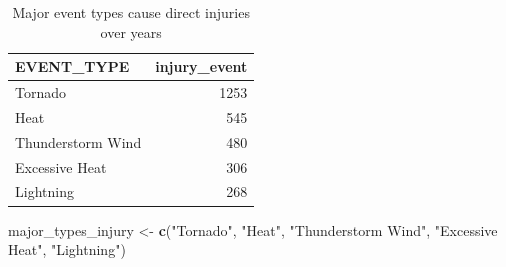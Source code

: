 \documentclass[
]{article}
\newenvironment{Shaded}{\begin{snugshade}}{\end{snugshade}}
\newcommand{\DataTypeTok}[1]{\textcolor[rgb]{0.13,0.29,0.53}{#1}}
\newcommand{\DecValTok}[1]{\textcolor[rgb]{0.00,0.00,0.81}{#1}}
\newcommand{\KeywordTok}[1]{\textcolor[rgb]{0.13,0.29,0.53}{\textbf{#1}}}
\newcommand{\NormalTok}[1]{#1}
\newcommand{\OperatorTok}[1]{\textcolor[rgb]{0.81,0.36,0.00}{\textbf{#1}}}
\newcommand{\StringTok}[1]{\textcolor[rgb]{0.31,0.60,0.02}{#1}}
\begin{document}
\begin{Shaded}
\end{Shaded}

\begin{table}[!h]

\caption{\label{tab:tab1}Major event types cause direct injuries over years}
\centering
\begin{tabular}[t]{lr}
\toprule
EVENT\_TYPE & injury\_event\\
\midrule
\rowcolor{gray!6}  Tornado & 1253\\
Heat & 545\\
\rowcolor{gray!6}  Thunderstorm Wind & 480\\
Excessive Heat & 306\\
\rowcolor{gray!6}  Lightning & 268\\
\bottomrule
\end{tabular}
\end{table}

\begin{Shaded}
\begin{Highlighting}[]
\NormalTok{major_types_injury <-}\StringTok{ }\KeywordTok{c}\NormalTok{(}\StringTok{"Tornado"}\NormalTok{, }\StringTok{"Heat"}\NormalTok{, }\StringTok{"Thunderstorm Wind"}\NormalTok{, }\StringTok{"Excessive Heat"}\NormalTok{, }\StringTok{"Lightning"}\NormalTok{)}
\end{Highlighting}
\end{Shaded}
\end{document}
